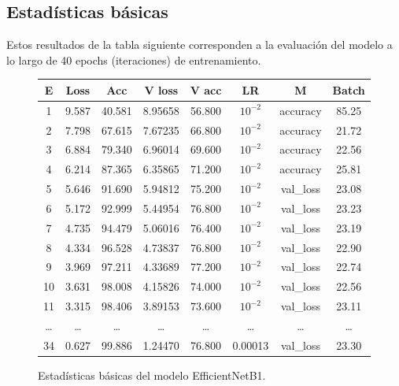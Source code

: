 \subsection*{Estadísticas básicas}\label{sub:basic_statistics_p1}
    
    Estos resultados de la tabla siguiente corresponden a la evaluación del modelo a lo largo de 40 epochs (iteraciones) de entrenamiento.

    \begin{figure}[ht]
      \small
      \begin{center}
          \begin{tabular}{|c|c|c|c|c|c|c|c|} \hline
          E & Loss & Acc & V loss & V acc & LR & M & Batch \\ \hline
          1 & 9.587 & 40.581 & 8.95658 & 56.800 & $10^{-2}$ & accuracy & 85.25 \\ \hline
          2 & 7.798 & 67.615 & 7.67235 & 66.800 & $10^{-2}$ & accuracy & 21.72 \\ \hline
          3 & 6.884 & 79.340 & 6.96014 & 69.600 & $10^{-2}$ & accuracy & 22.56 \\ \hline
          4 & 6.214 & 87.365 & 6.35865 & 71.200 & $10^{-2}$ & accuracy & 25.81 \\ \hline
          5 & 5.646 & 91.690 & 5.94812 & 75.200 & $10^{-2}$ & val\_loss & 23.08 \\ \hline
          6 & 5.172 & 92.999 & 5.44954 & 76.800 & $10^{-2}$ & val\_loss & 23.23 \\ \hline
          7 & 4.735 & 94.479 & 5.06016 & 76.400 & $10^{-2}$ & val\_loss & 23.19 \\ \hline
          8 & 4.334 & 96.528 & 4.73837 & 76.800 & $10^{-2}$ & val\_loss & 22.90 \\ \hline
          9 & 3.969 & 97.211 & 4.33689 & 77.200 & $10^{-2}$ & val\_loss & 22.74 \\ \hline
          10 & 3.631 & 98.008 & 4.15826 & 74.000 & $10^{-2}$ & val\_loss & 22.56 \\ \hline
          11 & 3.315 & 98.406 & 3.89153 & 73.600 & $10^{-2}$ & val\_loss & 23.11 \\ \hline
          \dots & \dots & \dots & \dots & \dots & \dots & \dots & \dots \\ \hline
          34 & 0.627 & 99.886 & 1.24470 & 76.800 & 0.00013 & val\_loss & 23.30 \\ \hline
          \end{tabular}
          \caption{Estadísticas básicas del modelo EfficientNetB1.}
      \end{center}\label{fig:estadisticas_p1}
  \end{figure}
    

